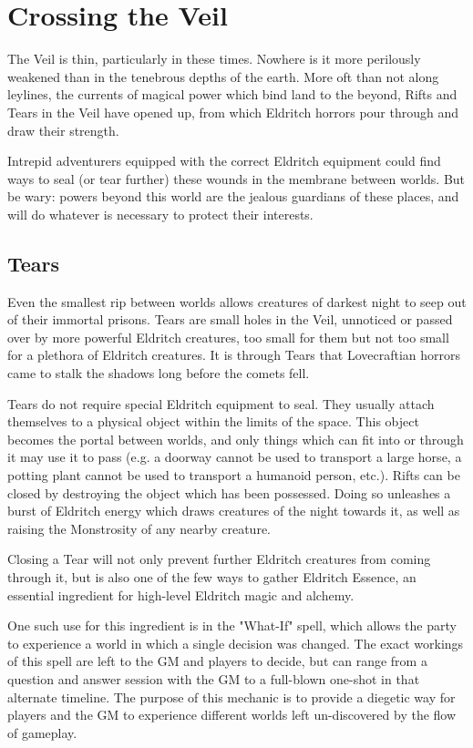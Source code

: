 \documentclass[./././main.tex]{subfiles}
\begin{document}
\section{Crossing the Veil}
The Veil is thin, particularly in these times. Nowhere is it more perilously weakened than in the tenebrous depths of the earth. More oft than not along leylines, the currents of magical power which bind land to the beyond, Rifts and Tears in the Veil have opened up, from which Eldritch horrors pour through and draw their strength.

Intrepid adventurers equipped with the correct Eldritch equipment could find ways to seal (or tear further) these wounds in the membrane between worlds. But be wary: powers beyond this world are the jealous guardians of these places, and will do whatever is necessary to protect their interests.

\subsection{Tears}
Even the smallest rip between worlds allows creatures of darkest night to seep out of their immortal prisons. Tears are small holes in the Veil, unnoticed or passed over by more powerful Eldritch creatures, too small for them but not too small for a plethora of Eldritch creatures. It is through Tears that Lovecraftian horrors came to stalk the shadows long before the comets fell. 

Tears do not require special Eldritch equipment to seal. They usually attach themselves to a physical object within the limits of the space. This object becomes the portal between worlds, and only things which can fit into or through it may use it to pass (e.g. a doorway cannot be used to transport a large horse, a potting plant cannot be used to transport a humanoid person, etc.). Rifts can be closed by destroying the object which has been possessed. Doing so unleashes a burst of Eldritch energy which draws creatures of the night towards it, as well as raising the Monstrosity of any nearby creature.

Closing a Tear will not only prevent further Eldritch creatures from coming through it, but is also one of the few ways to gather Eldritch Essence, an essential ingredient for high-level Eldritch magic and alchemy. 

One such use for this ingredient is in the "What-If" spell, which allows the party to experience a world in which a single decision was changed. The exact workings of this spell are left to the GM and players to decide, but can range from a question and answer session with the GM to a full-blown one-shot in that alternate timeline. The purpose of this mechanic is to provide a diegetic way for players and the GM to experience different worlds left un-discovered by the flow of gameplay.
\end{document}
